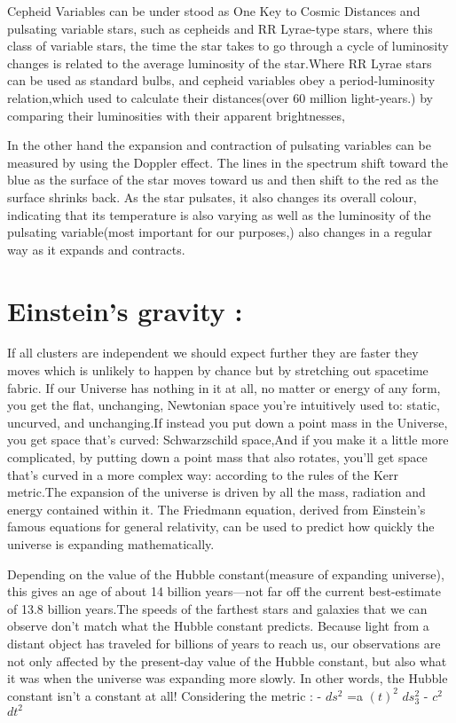 \documentclass[10pt]{article}
\begin{document}
 Cepheid Variables can be under stood as  One Key to Cosmic Distances and pulsating variable stars, such as cepheids and RR Lyrae-type stars, where this class of variable stars, the time the star takes to go through a cycle of luminosity changes is related to the average luminosity of the star.Where RR Lyrae stars can be used as standard bulbs, and cepheid variables obey a period-luminosity relation,which used to calculate their distances(over 60 million light-years.) by comparing their luminosities with their apparent brightnesses,
 
 In the other hand the expansion and contraction of pulsating variables can be measured by using the Doppler effect. The lines in the spectrum shift toward the blue as the surface of the star moves toward us and then shift to the red as the surface shrinks back. As the star pulsates, it also changes its overall colour, indicating that its temperature is also varying as well as  the luminosity of the pulsating variable(most important for our purposes,) also changes in a regular way as it expands and contracts.

\section{Einstein's gravity :}
 
 If all clusters are independent we should expect further they are faster they moves which is unlikely to happen by chance but by stretching out spacetime fabric.
 If our Universe has nothing in it at all, no matter or energy of any form, you get the flat, unchanging, Newtonian space you’re intuitively used to: static, uncurved, and unchanging.If instead you put down a point mass in the Universe, you get space that’s curved: Schwarzschild space,And if you make it a little more complicated, by putting down a point mass that also rotates, you’ll get space that’s curved in a more complex way: according to the rules of the Kerr metric.The expansion of the universe is driven by all the mass, radiation and energy contained within it. The Friedmann equation, derived from Einstein’s famous equations for general relativity, can be used to predict how quickly the universe is expanding mathematically.


 Depending on the value of the Hubble constant(measure of expanding universe), this gives an age of about 14 billion years—not far off the current best-estimate of 13.8 billion years.The speeds of the farthest stars and galaxies that we can observe don’t match what the Hubble constant predicts. Because light from a distant object has traveled for billions of years to reach us, our observations are not only affected by the present-day value of the Hubble constant, but also what it was when the universe was expanding more slowly. In other words, the Hubble constant isn’t a constant at all!
Considering the metric :
- $ ds^ {2} $ =a $ (t)^ {2} $ $ ds_ {3}^ {2} $ - $ c^ {2} $ $ dt^ {2} $ 
\end{document}

